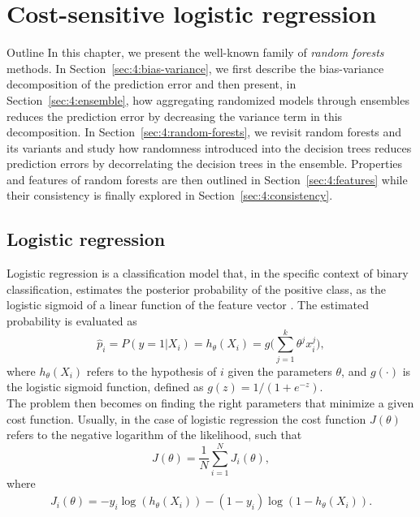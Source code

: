 \chapter{Cost-sensitive logistic regression}

\begin{remark}{Outline}
In this chapter, we present the well-known family of \textit{random forests}
methods. In Section~\ref{sec:4:bias-variance}, we first describe the bias-variance
decomposition of the prediction error and then present, in
Section~\ref{sec:4:ensemble}, how aggregating randomized models through
ensembles reduces the prediction error by decreasing the variance term in this
decomposition. In Section~\ref{sec:4:random-forests}, we revisit random forests
and its variants and study how randomness introduced into the decision trees
reduces prediction errors by decorrelating the decision
trees in the ensemble. Properties and features of random forests are then outlined
in Section~\ref{sec:4:features} while their consistency
is finally explored in Section~\ref{sec:4:consistency}.
\end{remark}

\section{Logistic regression}

  Logistic regression is a classification model that, in the specific context of binary 
  classification, estimates the posterior probability of the positive class, as the logistic 
  sigmoid of a linear function of the feature vector \citep{Bishop2006}. The estimated probability 
  is evaluated as 
  \begin{equation}
    \hat p_i = P(y=1 \vert X_i) = h_\theta(X_i) = g\biggl(\sum_{j=1}^{k}{\theta^jx_i^j}\biggr),
  \end{equation}
  where $h_\theta(X_i)$ refers to the hypothesis of $i$ given the parameters $\theta$,  and 
  $g(\cdot)$ is the logistic sigmoid function, defined as \mbox{$g(z)=1/(1+e^{-z})$}.\\
  The problem then becomes on finding the right parameters that minimize a given cost function. 
  Usually, in the case of logistic regression the cost function $J(\theta)$ refers to the negative 
  logarithm of the likelihood, such that
  \begin{equation}
    J(\theta)=\frac{1}{N}\sum_{i=1}^{N} J_i(\theta),
  \end{equation}
  where
  \begin{align}
    J_i(\theta) =  -y_i\log(h_\theta(X_i)) -(1-y_i)\log(1-h_\theta(X_i)).
  \end{align}\label{eq:j}
   
